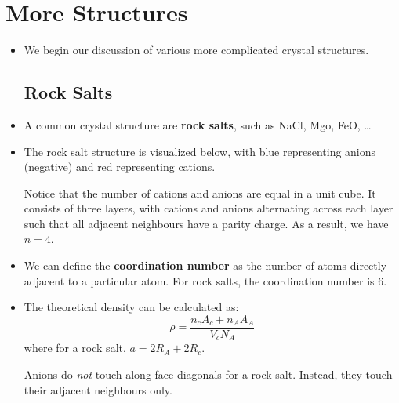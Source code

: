 \section{More Structures}
\begin{itemize}
    \item We begin our discussion of various more complicated crystal structures.
    \subsection{Rock Salts}
    \item A common crystal structure are \textbf{rock salts}, such as NaCl, Mgo, FeO, \dots
    \item The rock salt structure is visualized below, with blue representing anions (negative) and red representing cations.
    \begin{center}
    \end{center}
    Notice that the number of cations and anions are equal in a unit cube. It consists of three layers, with cations and anions alternating across each layer such that all adjacent neighbours have a parity charge. As a result, we have $n=4$.
    \item We can define the \textbf{coordination number} as the number of atoms directly adjacent to a particular atom. For rock salts, the coordination number is $6$.
    \item The theoretical density can be calculated as:
    \begin{equation}
        \rho = \frac{n_cA_c + n_AA_A}{V_cN_A}
    \end{equation}
    where for a rock salt, $a=2R_A+2R_c$.
    \begin{warning}
        Anions do \textit{not} touch along face diagonals for a rock salt. Instead, they touch their adjacent neighbours only.
    \end{warning}

\end{itemize}
